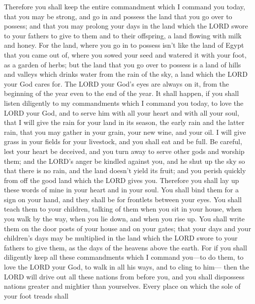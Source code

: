  Therefore you shall keep the entire commandment which I
command you today, that you may be strong, and go in and possess the
land that you go over to possess;  and that you may
prolong your days in the land which the LORD swore to your fathers to
give to them and to their offspring, a land flowing with milk and honey.
 For the land, where you go in to possess isn't like the
land of Egypt that you came out of, where you sowed your seed and
watered it with your foot, as a garden of herbs;  but the
land that you go over to possess is a land of hills and valleys which
drinks water from the rain of the sky,  a land which the
LORD your God cares for. The LORD your God's eyes are always on it, from
the beginning of the year even to the end of the year. 
It shall happen, if you shall listen diligently to my commandments which
I command you today, to love the LORD your God, and to serve him with
all your heart and with all your soul,  that I will give
the rain for your land in its season, the early rain and the latter
rain, that you may gather in your grain, your new wine, and your oil.
 I will give grass in your fields for your livestock, and
you shall eat and be full.  Be careful, lest your heart
be deceived, and you turn away to serve other gods and worship them;
 and the LORD's anger be kindled against you, and he shut
up the sky so that there is no rain, and the land doesn't yield its
fruit; and you perish quickly from off the good land which the LORD
gives you.  Therefore you shall lay up these words of
mine in your heart and in your soul. You shall bind them for a sign on
your hand, and they shall be for frontlets between your eyes.
 You shall teach them to your children, talking of them
when you sit in your house, when you walk by the way, when you lie down,
and when you rise up.  You shall write them on the door
posts of your house and on your gates;  that your days
and your children's days may be multiplied in the land which the LORD
swore to your fathers to give them, as the days of the heavens above the
earth.  For if you shall diligently keep all these
commandments which I command you---to do them, to love the LORD your
God, to walk in all his ways, and to cling to him--- 
then the LORD will drive out all these nations from before you, and you
shall dispossess nations greater and mightier than yourselves.
 Every place on which the sole of your foot treads shall
